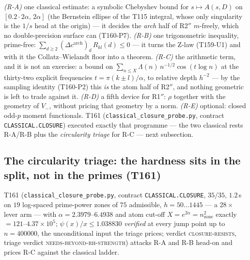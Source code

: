 \documentclass[11pt,a4paper]{article}
\begin{document}
\begin{keybox}
\emph{(R-A)} one classical estimate: a symbolic Chebyshev bound for $s\mapsto
A(s,D)$ on $[0.2\cdot2\alpha,\,2\alpha]$ (the Bernstein ellipse of the T115
integral, whose only singularity is the $1/s$ head at the origin) --- it decides
the \emph{arch} half of R2$''$ $m$-freely, which no double-precision surface can
(T160-P7). \emph{(R-B)} one trigonometric inequality, prime-free:
$\sum_{d\ge2}(\Delta c^{\mathrm{arch}})_d\,R_{kl}(d)\le0$ --- it turns the Z-law
(T159-U1) and with it the Collatz--Wielandt floor into a theorem. \emph{(R-C)}
the arithmetic term, and it is not an exercise: a bound on $\sum_{n\le X}
\Lambda(n)\,n^{-1/2}\cos(t\log n)$ at the thirty-two explicit frequencies
$t=\pi(k\pm l)/\alpha$, to relative depth $h^{-2}$ --- by the sampling identity
(T160-P2) this \emph{is} the atom half of R2$''$, and nothing geometric is left
to trade against it. \emph{(R-D)} a fifth device for R1$''$: $\rho$ together
with the geometry of $V_-$, without pricing that geometry by a norm.
\emph{(R-E)} optional: closed odd-$p$ moment functionals. T161
(\texttt{classical\_closure\_probe.py}, contract \texttt{CLASSICAL.CLOSURE})
executed exactly that programme --- the two classical rests R-A/R-B plus the
\emph{circularity triage} for R-C --- next subsection.
\end{keybox}

\subsection{The circularity triage: the hardness sits in the split, not in the
primes (T161)}
T161 (\texttt{classical\_closure\_probe.py}, contract \texttt{CLASSICAL.CLOSURE},
$35/35$, $1.2$\,s on $19$ log-spaced prime-power zones of $75$ admissible,
$h=50\ldots1445$ --- a $28\times$ lever arm --- with $\alpha=2.3979$--$6.4938$ and
atom cut-off $X=e^{2\alpha}=n_{\mathrm{zone}}^2$ exactly $=121$--$4.37\times10^{5}$;
$\psi(x)/x\le1.038830$ \emph{verified} at every jump point up to $n=400000$, the
unconditional input the triage prices; verdict \textsc{closure-resists}, triage
verdict \textsc{needs-beyond-rh-strength}) attacks R-A and R-B head-on and prices
R-C against the classical ladder.
\end{document}
